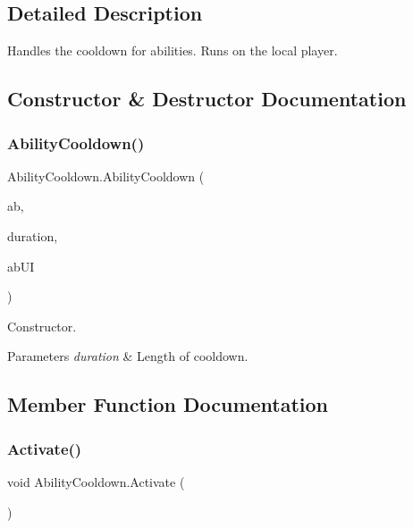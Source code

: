 \subsection{Detailed Description}
Handles the cooldown for abilities. Runs on the local player. 



\subsection{Constructor \& Destructor Documentation}
\hypertarget{class_ability_cooldown_a1ca2a7d717770a00d713f60c98213511}{}\label{class_ability_cooldown_a1ca2a7d717770a00d713f60c98213511} 
\subsubsection{\texorpdfstring{Ability\+Cooldown()}{AbilityCooldown()}}
{\footnotesize\ttfamily Ability\+Cooldown.\+Ability\+Cooldown (\begin{DoxyParamCaption}\item[{\hyperlink{class_ability}{Ability}}]{ab,  }\item[{float}]{duration,  }\item[{\hyperlink{class_ability_u_i}{Ability\+UI}}]{ab\+UI }\end{DoxyParamCaption})}



Constructor. 


\begin{DoxyParams}{Parameters}
{\em duration} & Length of cooldown.\\
\hline
\end{DoxyParams}


\subsection{Member Function Documentation}
\hypertarget{class_ability_cooldown_acd67a3f56a47bc9c226a359d24a276eb}{}\label{class_ability_cooldown_acd67a3f56a47bc9c226a359d24a276eb} 
\subsubsection{\texorpdfstring{Activate()}{Activate()}}
{\footnotesize\ttfamily void Ability\+Cooldown.\+Activate (\begin{DoxyParamCaption}{ }\end{DoxyParamCaption})}




